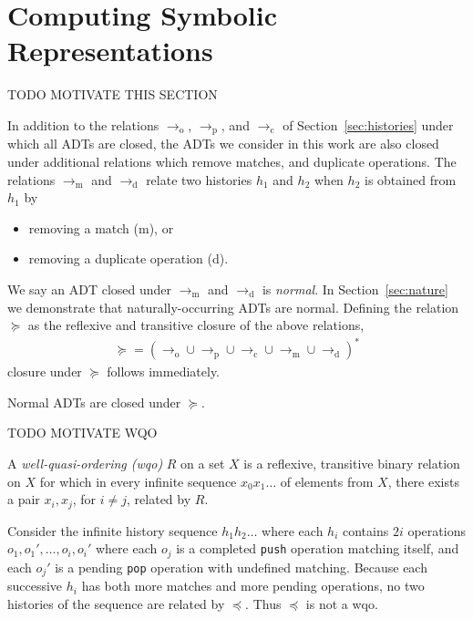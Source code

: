 \section{Computing Symbolic Representations}
\label{sec:algorithm}

TODO MOTIVATE THIS SECTION

In addition to the relations $\to_\mathrm{o}$, $\to_\mathrm{p}$, and
$\to_\mathrm{c}$ of Section~\ref{sec:histories} under which all ADTs are
closed, the ADTs we consider in this work are also closed under additional
relations which remove matches, and duplicate operations. The relations
$\to_\mathrm{m}$ and $\to_\mathrm{d}$ relate two histories $h_1$ and $h_2$ when
$h_2$ is obtained from $h_1$ by
\begin{itemize}

  \item removing a match (m), or

  \item removing a duplicate operation (d).

\end{itemize}
We say an ADT closed under $\to_\mathrm{m}$ and $\to_\mathrm{d}$ is
\emph{normal}. In Section~\ref{sec:nature} we demonstrate that
naturally-occurring ADTs are normal. Defining the relation $\succeq$ as the
reflexive and transitive closure of the above relations,
\begin{align*}
  \succeq = (\to_\mathrm{o} \cup \to_\mathrm{p} \cup \to_\mathrm{c} \cup 
  \to_\mathrm{m} \cup \to_\mathrm{d})^\ast
\end{align*}
closure under $\succeq$ follows immediately.

\begin{lemma}

  Normal ADTs are closed under $\succeq$.

\end{lemma}

TODO MOTIVATE WQO

A \emph{well-quasi-ordering (wqo)} $R$ on a set $X$ is a reflexive, transitive
binary relation on $X$ for which in every infinite sequence $x_0 x_1 \ldots$ of
elements from $X$, there exists a pair $x_i, x_j$, for $i \neq j$, related by
$R$.

\begin{example}

  Consider the infinite history sequence $h_1 h_2 \ldots$ where each $h_i$
  contains $2i$ operations $o_1, o_1', \ldots, o_i, o_i'$ where each $o_j$ is a
  completed {\tt push} operation matching itself, and each $o_j'$ is a pending
  {\tt pop} operation with undefined matching. Because each successive $h_i$
  has both more matches and more pending operations, no two histories of the
  sequence are related by $\preceq$. Thus $\preceq$ is not a wqo.

\end{example}

